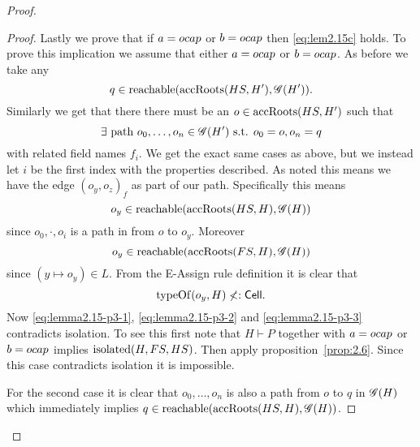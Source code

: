 \begin{proof}
\begin{description}
\begin{description}
\begin{description}
\begin{proof}
                Lastly we prove that if $a = \mbox{$ocap$}$ or $b = \mbox{$ocap$}$ then
                \eqref{eq:lem2.15c} holds. To prove this implication we assume
                that either $a = \mbox{$ocap$}$ or $b = \mbox{$ocap$}$. As before we take any
                \begin{equation}
                  q \in \mbox{$\mathrm{reachable}$}(\mbox{$\mathrm{accRoots}$}(HS, H'), \mathscr{G}(H')).
                \end{equation}
                Similarly we get that there there must be an $o \in
                \mbox{$\mathrm{accRoots}$}(HS, H')$ such that
                \begin{equation}
                  \exists \text{ path } o_0, \dots, o_n \in \mathscr{G}(H') \text{ s.t. } o_0 = o,
                  o_n = q
                \end{equation}
                with related field names $f_i$. We get the exact same cases as
                above, but we instead let $i$ be the first index with the
                properties described. As noted this means we have the edge
                $(o_y, o_z)_f$ as part of our path. Specifically this means
                \begin{equation}\label{eq:lemma2.15-p3-1}
                  o_y \in \mbox{$\mathrm{reachable}$}(\mbox{$\mathrm{accRoots}$}(HS, H), \mathscr{G}(H))
                \end{equation}
                since $o_0, \cdot, o_i$ is a path in \Graph from $o$ to $o_y$.
                Moreover
                \begin{equation}\label{eq:lemma2.15-p3-2}
                  o_y \in \mbox{$\mathrm{reachable}$}(\mbox{$\mathrm{accRoots}$}(FS, H), \mathscr{G}(H))
                \end{equation}
                since $(y \mapsto o_y) \in L$. From the {\sc E-Assign} rule
                definition it is clear that
                \begin{equation}\label{eq:lemma2.15-p3-3}
                  \mbox{$\mathrm{typeOf}$}(o_y, H) \not<: \mbox{$\mathsf{Cell}$}.
                \end{equation}
                Now \eqref{eq:lemma2.15-p3-1}, \eqref{eq:lemma2.15-p3-2} and
                \eqref{eq:lemma2.15-p3-3} contradicts isolation. To see this
                first note that $H \vdash P$ together with $a = \mbox{$ocap$}$ or $b =
                \mbox{$ocap$}$ implies $\mbox{$\mathrm{isolated}$}(H, FS, HS)$. Then apply
                proposition~\ref{prop:2.6}. Since this case contradicts
                isolation it is impossible.
                
                For the second case it is clear that $o_0, \dots, o_n$ is also a
                path from $o$ to $q$ in $\mathscr{G}(H)$ which immediately implies
                $q \in \mbox{$\mathrm{reachable}$}(\mbox{$\mathrm{accRoots}$}(HS, H), \mathscr{G}(H))$.


\end{proof}
\end{description}
\end{description}
\end{description}
\end{proof}
